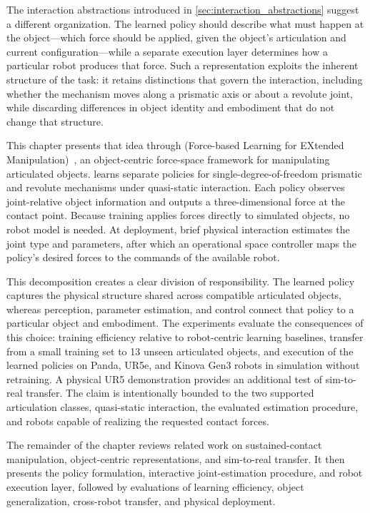 The interaction abstractions introduced in \cref{sec:interaction_abstractions} suggest a different organization. The learned policy should describe what must happen at the object---which force should be applied, given the object's articulation and current configuration---while a separate execution layer determines how a particular robot produces that force. Such a representation exploits the inherent structure of the task: it retains distinctions that govern the interaction, including whether the mechanism moves along a prismatic axis or about a revolute joint, while discarding differences in object identity and embodiment that do not change that structure.

This chapter presents that idea through \FLEX{} (Force-based Learning for EXtended Manipulation)~\citep{fang2025flex}, an object-centric force-space framework for manipulating articulated objects. \FLEX{} learns separate policies for single-degree-of-freedom prismatic and revolute mechanisms under quasi-static interaction. Each policy observes joint-relative object information and outputs a three-dimensional force at the contact point. Because training applies forces directly to simulated objects, no robot model is needed. At deployment, brief physical interaction estimates the joint type and parameters, after which an operational space controller maps the policy's desired forces to the commands of the available robot.

This decomposition creates a clear division of responsibility. The learned policy captures the physical structure shared across compatible articulated objects, whereas perception, parameter estimation, and control connect that policy to a particular object and embodiment. The experiments evaluate the consequences of this choice: training efficiency relative to robot-centric learning baselines, transfer from a small training set to 13 unseen articulated objects, and execution of the learned policies on Panda, UR5e, and Kinova Gen3 robots in simulation without retraining. A physical UR5 demonstration provides an additional test of sim-to-real transfer. The claim is intentionally bounded to the two supported articulation classes, quasi-static interaction, the evaluated estimation procedure, and robots capable of realizing the requested contact forces.

The remainder of the chapter reviews related work on sustained-contact manipulation, object-centric representations, and sim-to-real transfer. It then presents the \FLEX{} policy formulation, interactive joint-estimation procedure, and robot execution layer, followed by evaluations of learning efficiency, object generalization, cross-robot transfer, and physical deployment.
